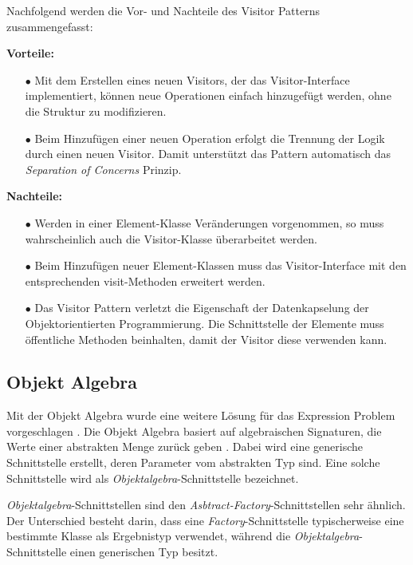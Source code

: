 \documentclass{llncs}
\begin{document}
Nachfolgend werden die Vor- und Nachteile des Visitor Patterns zusammengefasst: \linebreak

\textbf{Vorteile:}
\begin{itemize}
	\item[$\bullet$] Mit dem Erstellen eines neuen Visitors, der das Visitor-Interface implementiert, können neue Operationen einfach hinzugefügt werden, ohne die Struktur zu modifizieren.
	\item[$\bullet$] Beim Hinzufügen einer neuen Operation erfolgt die Trennung der Logik durch einen neuen Visitor. Damit unterstützt das Pattern automatisch das \textit{Separation of Concerns} Prinzip.
\end{itemize}

\textbf{Nachteile:}
\begin{itemize}
	\item[$\bullet$] Werden in einer Element-Klasse Veränderungen vorgenommen, so muss wahrscheinlich auch die Visitor-Klasse überarbeitet werden.
	\item[$\bullet$] Beim Hinzufügen neuer Element-Klassen muss das Visitor-Interface mit den entsprechenden visit-Methoden erweitert werden.
	\item[$\bullet$] Das Visitor Pattern verletzt die Eigenschaft der Datenkapselung der Objektorientierten Programmierung. Die Schnittstelle der Elemente muss öffentliche Methoden beinhalten, damit der Visitor diese verwenden kann.
\end{itemize}

\subsection{Objekt Algebra} \label{sec:object-algebra}
Mit der Objekt Algebra wurde eine weitere Lösung für das Expression Problem vorgeschlagen \cite{Oliveira12}. Die Objekt Algebra basiert auf algebraischen Signaturen, die Werte einer abstrakten Menge zurück geben \cite{Guttag78}. Dabei wird eine generische Schnittstelle erstellt, deren Parameter vom abstrakten Typ sind. Eine solche Schnittstelle wird als \textit{Objektalgebra}-Schnittstelle bezeichnet.

\textit{Objektalgebra}-Schnittstellen  sind den \textit{Asbtract-Factory}-Schnittstellen sehr ähnlich. Der Unterschied besteht darin, dass eine \textit{Factory}-Schnittstelle typischerweise eine bestimmte Klasse als Ergebnistyp verwendet, während die \textit{Objektalgebra}-Schnittstelle einen generischen Typ besitzt.
\end{document}
